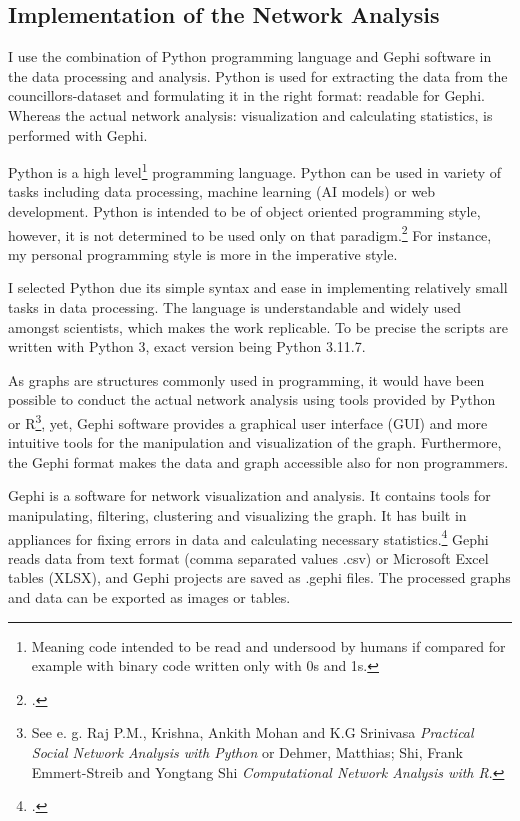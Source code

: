 \subsection{Implementation of the Network Analysis}
I use the combination of Python programming language and Gephi software in the data processing and analysis. Python is used for extracting the data from the councillors-dataset and formulating it in the right format: readable for Gephi. Whereas the actual network analysis: visualization and calculating statistics, is performed with Gephi. 

Python is a high level\footnote{Meaning code intended to be read and undersood by humans if compared for example with binary code written only with 0s and 1s.} programming language. Python can be used in variety of tasks including data processing, machine learning (AI models) or web development. Python is intended to be of object oriented programming style, however, it is not determined to be used only on that paradigm.\footcite[p. 1.]{pythonbook} For instance, my personal programming style is more in the imperative style. 

I selected Python due its simple syntax and ease in implementing relatively small tasks in data processing. The language is understandable and widely used amongst scientists, which makes the work replicable. To be precise the scripts are written with Python 3, exact version being Python 3.11.7.

As graphs are structures commonly used in programming, it would have been possible to conduct the actual network analysis using tools provided by Python or R\footnote{See e. g. Raj P.M., Krishna, Ankith Mohan and K.G Srinivasa \textit{Practical Social Network Analysis with Python} or Dehmer, Matthias; Shi, Frank Emmert-Streib and Yongtang Shi \textit{Computational Network Analysis with R}.}, yet, Gephi software provides a graphical user interface (GUI) and more intuitive tools for the manipulation and visualization of the graph. Furthermore, the Gephi format makes the data and graph accessible also for non programmers.

Gephi is a software for network visualization and analysis. It contains tools for manipulating, filtering, clustering and visualizing the graph. It has built in appliances for fixing errors in data and calculating necessary statistics.\footcite{gephi} Gephi reads data from text format (comma separated values .csv) or Microsoft Excel tables (XLSX), and Gephi projects are saved as .gephi files. The processed graphs and data can be exported as images or tables.  

